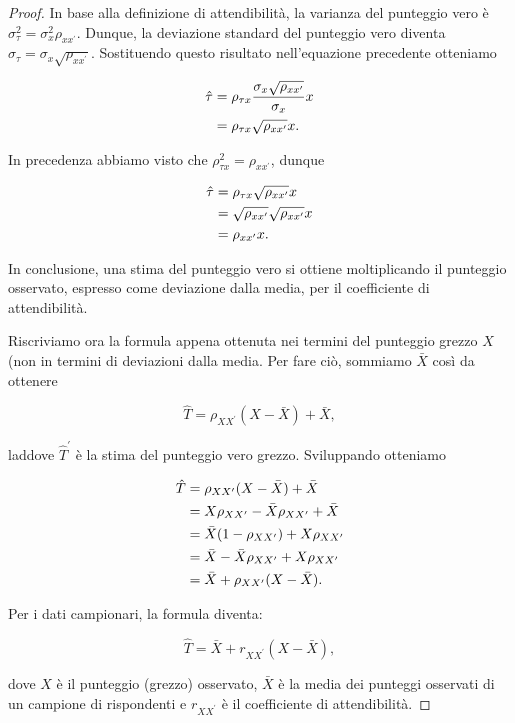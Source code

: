 \documentclass[
  11pt,
]{krantz}
\theoremstyle{definition}
\theoremstyle{definition}
\theoremstyle{definition}
\theoremstyle{definition}
\theoremstyle{remark}
\begin{document}
\begin{proof}
In base alla definizione di attendibilità, la varianza del punteggio vero è \(\sigma^2_{\tau} = \sigma^2_x \rho_{xx^\prime}\). Dunque, la deviazione standard del punteggio vero diventa \(\sigma_{\tau} = \sigma_x \sqrt{\rho_{xx^\prime}}\). Sostituendo questo risultato nell'equazione precedente otteniamo

\begin{equation}
\begin{aligned}
\hat{\tau} &= \rho_{\tau x}\frac{\sigma_x \sqrt{\rho_{xx^\prime}}}{\sigma_x} x
\notag\\
&=  \rho_{\tau x}  \sqrt{\rho_{xx^\prime}} x. \notag
\end{aligned}
\end{equation}

In precedenza abbiamo visto che \(\rho^2_{\tau x} = \rho_{xx^\prime}\), dunque

\begin{equation}
\begin{aligned}
\hat{\tau} &= \rho_{\tau x} \sqrt{\rho_{xx^\prime}} x \notag\\
        &= \sqrt{\rho_{xx^\prime}} \sqrt{\rho_{xx^\prime}} x \notag\\
        &= \rho_{xx^\prime} x.
\label{eq:hat-t-part}
\end{aligned}
\end{equation}

In conclusione, una stima del punteggio vero si ottiene moltiplicando il punteggio osservato, espresso come deviazione dalla media, per il coefficiente di attendibilità.

Riscriviamo ora la formula appena ottenuta nei termini del punteggio grezzo \(X\) (non in termini di deviazioni dalla media. Per fare ciò, sommiamo \(\bar{X}\) così da ottenere

\[
\hat{T} = \rho_{XX^\prime} (X - \bar{X}) + \bar{X}, 
\]

laddove \(\hat{T}^\prime\) è la stima del punteggio vero grezzo. Sviluppando otteniamo

\begin{equation}
\begin{aligned}
\hat{T} &= \rho_{XX^\prime} (X - \bar{X}) + \bar{X}\notag\\
 &=  X\rho_{XX^\prime}  - \bar{X} \rho_{XX^\prime} + \bar{X}\notag\\
&= \bar{X} (1 - \rho_{XX^\prime}) + X\rho_{XX^\prime}\notag\\
&= \bar{X} - \bar{X}\rho_{XX'} + X\rho_{XX^\prime}\notag\\
&= \bar{X} + \rho_{XX'} (X - \bar{X}).\notag
\end{aligned}
\end{equation}

Per i dati campionari, la formula diventa:

\[
\hat{T} = \bar{X} + r_{XX^\prime}  (X - \bar{X}),
\]

dove \(X\) è il punteggio (grezzo) osservato, \(\bar{X}\) è la media dei punteggi osservati di un campione di rispondenti e \(r_{XX^\prime}\) è il coefficiente di attendibilità.
\end{proof}
\end{document}
